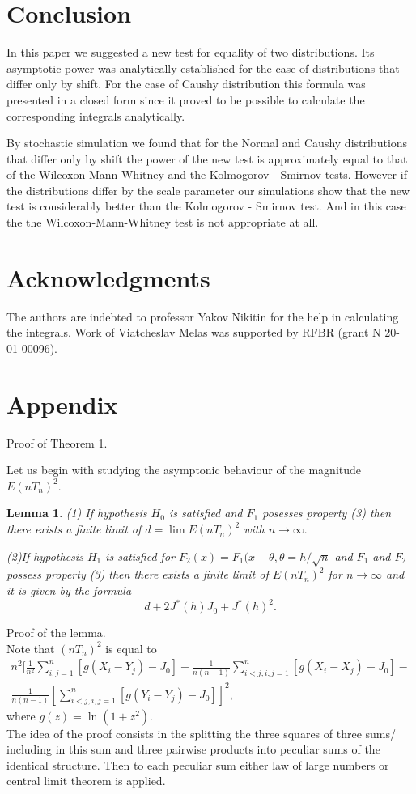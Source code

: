 \documentclass[final,11pt,3p]{elsarticle}
\newtheorem{lemma}{Lemma}
\begin{document}
\section{Conclusion}
In this paper we suggested a new test for equality of two distributions. Its asymptotic power was analytically established for the case of distributions that differ only by shift. For the case of Caushy distribution this formula was presented in a closed form  since it proved to be possible to calculate the corresponding integrals analytically.

By stochastic simulation we found that for the Normal and Caushy distributions that differ only by shift the power of the new test is approximately equal to that of the Wilcoxon-Mann-Whitney and the
Kolmogorov - Smirnov tests. However if the distributions differ by the scale parameter our simulations show that the new test is considerably better than the Kolmogorov - Smirnov test. And in this case the the Wilcoxon-Mann-Whitney test is not appropriate at all.

\section*{Acknowledgments}
The authors are indebted to professor
 Yakov Nikitin for the help in calculating the  integrals. Work of Viatcheslav Melas was supported by RFBR (grant N 20-01-00096).

\section{Appendix}
Proof of Theorem 1.

Let us begin with studying the asymptonic behaviour of the magnitude $E(nT_n)^2$.

\begin{lemma}
(1) If hypothesis $H_0$ is satisfied and $F_1$ posesses property (3) then there exists a finite  limit of $d=\lim E(nT_n)^2$ with $n \to \infty.$

(2)If hypothesis $H_1$ is satisfied for $F_2(x)= F_1(x-\theta,\theta= h/\sqrt{n}$ and $F_1$ and $F_2$ possess property (3)  then there exists a finite  limit of $E(nT_n)^2$ for $n \to \infty$ and it is given by the formula
$$
d + 2J^*(h)J_0 + J^*(h)^2.
$$
\end{lemma}
Proof of the lemma.\\
Note that $(nT_n)^2$ is equal to
\begin{eqnarray*}
n^2 [\frac{1}{n^2}\sum_{i,j=1}^n [g(X_i - Y_j)-J_0]-\frac{1}{ n(n-1)}\sum_{i<j,i,j=1}^n  [g(X_i - X_j)-J_0] - \\ \frac{1}{n(n-1)}[\sum_{i<j,i,j=1}^n  [g(Y_i - Y_j)-J_0]]^2,
\end{eqnarray*}
where $g(z)= \ln(1+z^2).$\\
The idea of the proof consists in the splitting the three squares of three sums/ including in this sum and three
pairwise products into peculiar sums of the identical structure.
Then to each peculiar sum either law of large numbers or central limit theorem is applied.\\
\end{document}
